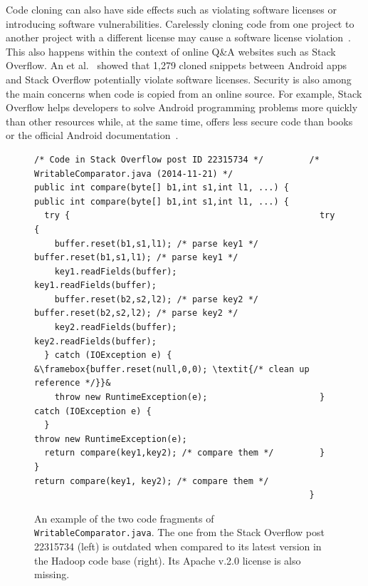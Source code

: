 \documentclass[10pt,journal,compsoc]{IEEEtran}
\begin{document}
Code cloning can also have side effects such as violating software licenses or
introducing software vulnerabilities. Carelessly cloning code from one project
to another project with a different license may cause a software license
violation~\cite{German2009}. This also happens within the context of online Q\&A
websites such as Stack Overflow. An et al.~\cite{An2017} showed that 1,279
cloned snippets between Android apps and Stack Overflow potentially violate
software licenses. Security is also among the main concerns when code is copied
from an online source. For example, Stack Overflow helps developers to solve
Android programming problems more quickly than other resources while, at the
same time, offers less secure code than books or the official Android
documentation~\cite{Acar2016}.

\begin{figure}
	\begin{lstlisting}[escapechar=&]
/* Code in Stack Overflow post ID 22315734 */         /* WritableComparator.java (2014-11-21) */
public int compare(byte[] b1,int s1,int l1, ...) {    public int compare(byte[] b1,int s1,int l1, ...) {
  try {                                                 try {
    buffer.reset(b1,s1,l1); /* parse key1 */              buffer.reset(b1,s1,l1); /* parse key1 */
    key1.readFields(buffer);                              key1.readFields(buffer);
    buffer.reset(b2,s2,l2); /* parse key2 */              buffer.reset(b2,s2,l2); /* parse key2 */
    key2.readFields(buffer);                              key2.readFields(buffer);
  } catch (IOException e) {                               &\framebox{buffer.reset(null,0,0); \textit{/* clean up reference */}}&
    throw new RuntimeException(e);                      } catch (IOException e) {
  }                                                       throw new RuntimeException(e);
  return compare(key1,key2); /* compare them */         }
}                                                       return compare(key1, key2); /* compare them */
                                                      }
	\end{lstlisting}\vspace{-2ex}
	\caption{An example of the two code fragments of
		{\small\texttt{WritableComparator.java}}. The one from the
		Stack Overflow post 22315734 (left) is outdated when compared to
		its latest version in the \textsf{Hadoop} code base
		(right). Its Apache v.2.0 license is also missing.}
	\label{fig:before-after}
\end{figure}
\end{document}
